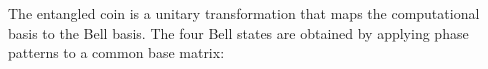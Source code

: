 The entangled coin is a unitary transformation that maps the
computational basis to the Bell basis. The four Bell states are
obtained by applying phase patterns to a common base matrix:
